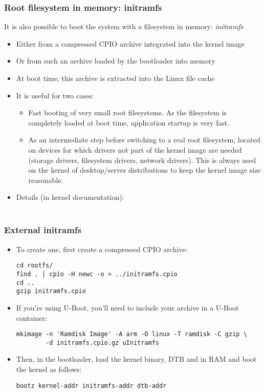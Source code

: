 \begin{frame}
  \frametitle{Root filesystem in memory: initramfs}
  It is also possible to boot the system with a filesystem in memory:
  {\em initramfs}
  \begin{itemize}
  \item Either from a compressed CPIO archive integrated into the kernel image
  \item Or from such an archive loaded by the bootloader into memory
  \item At boot time, this archive is extracted into the Linux file cache
  \item It is useful for two cases:
    \begin{itemize}
    \item Fast booting of very small root filesystems. As the
      filesystem is completely loaded at boot time, application
      startup is very fast.
    \item As an intermediate step before switching to a real root
      filesystem, located on devices for which drivers not part of the
      kernel image are needed (storage drivers, filesystem drivers,
      network drivers). This is always used on the kernel of
      desktop/server distributions to keep the kernel image size
      reasonable.
    \end{itemize}
  \item Details (in kernel documentation): \\
    \\
  \end{itemize}
\end{frame}

\begin{frame}[fragile]
  \frametitle{External initramfs}
  \begin{itemize}
  \item To create one, first create a compressed CPIO archive:
 \begin{verbatim}
cd rootfs/
find . | cpio -H newc -o > ../initramfs.cpio
cd ..
gzip initramfs.cpio
\end{verbatim}
  \item If you're using U-Boot, you'll need to include your archive
  in a U-Boot container:
  \begin{verbatim}
mkimage -n 'Ramdisk Image' -A arm -O linux -T ramdisk -C gzip \
        -d initramfs.cpio.gz uInitramfs
\end{verbatim}
  \item Then, in the bootloader, load the kernel binary, DTB and
  \code{uInitramfs} in RAM and boot the kernel as follows:
  \begin{verbatim}
bootz kernel-addr initramfs-addr dtb-addr
\end{verbatim}
  \end{itemize}
\end{frame}

